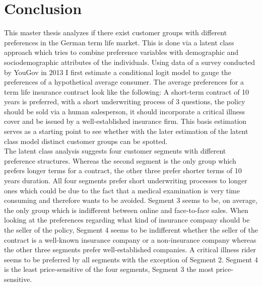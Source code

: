 \documentclass[12pt, abstracton]{article}
\begin{document}
\section{Conclusion}
This master thesis analyzes if there exist customer groups with different preferences in the German term life market. This is done via a latent class approach which tries to combine preference variables with demographic and sociodemographic attributes of the individuals. Using data of a survey conducted by YouGov in 2013 I first estimate a conditional logit model to gauge the preferences of a hypothetical average consumer. The average preferences for a term life insurance contract look like the following: A short-term contract of 10 years is preferred, with a short underwriting process of 3 questions, the policy should be sold via a human salesperson, it should incorporate a critical illness cover and be issued by a well-established insurance firm. This basis estimation serves as a starting point to see whether with the later estimation of the latent class model distinct customer groups can be spotted.\\
The latent class analysis suggests four customer segments with different preference structures. Whereas the second segment is the only group which prefers longer terms for a contract, the other three prefer shorter terms of 10 years duration. All four segments prefer short underwriting processes to longer ones which could be due to the fact that a medical examination is very time consuming and therefore wants to be avoided.
Segment 3 seems to be, on average, the only group which is indifferent between online and face-to-face sales. When looking at the preferences regarding what kind of insurance company should be the seller of the policy, Segment 4 seems to be indifferent whether the seller of the contract is a well-known insurance company or a non-insurance company whereas the other three segments prefer well-established companies. A critical illness rider seems to be preferred by all segments with the exception of Segment 2. Segment 4 is the least price-sensitive of the four segments, Segment 3 the most price-sensitive.\\
\end{document}
